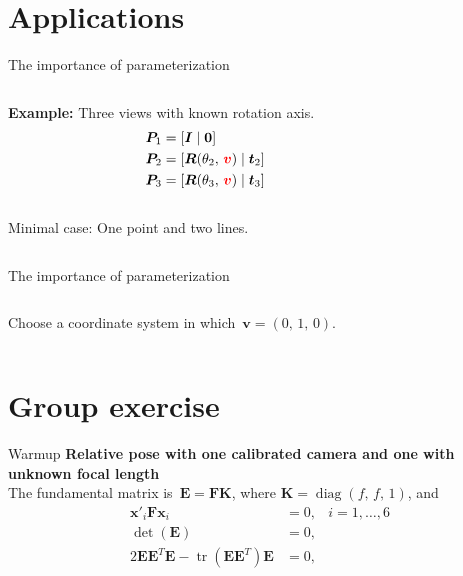 \documentclass[aspectratio=169]{beamer}
\newcommand{\mat}[1]{\bm{#1}}
\DeclareMathOperator{\tr}{tr}
\DeclareMathOperator{\diag}{diag}
\newcommand{\T}{T}
\begin{document}
\section{Applications}
\begin{frame}{The importance of parameterization}
\begin{columns}
    \begin{column}{0.5\textwidth}
        \textbf{Example:} Three views with known rotation axis.\\[8mm]
        \begin{equation*}
            \begin{aligned}
                \mat{P}_1 &= [\mat{I}\;|\;\mat{0}] \\
                \mat{P}_2 &= [\mat{R}(\theta_2,\,{\color{red}\mat{v}})\;|\;\mat{t}_2] \\
                \mat{P}_3 &= [\mat{R}(\theta_3,\,{\color{red}\mat{v}})\;|\;\mat{t}_3]
            \end{aligned}
        \end{equation*}\\[8mm]
        Minimal case: One point and two lines.
    \end{column}%
    \begin{column}{0.5\textwidth}
        \centering
        
    \end{column}
\end{columns}
\end{frame}

\begin{frame}{The importance of parameterization}
\begin{columns}
    \begin{column}{0.5\textwidth}
        Choose a coordinate system in which~$\mat{v}=(0,\,1,\,0)$.
    \end{column}%
    \begin{column}{0.5\textwidth}
        \centering
        
    \end{column}
\end{columns}

\end{frame}

\section{Group exercise}

\begin{frame}{Warmup}
\textbf{Relative pose with one calibrated camera and one with unknown focal length}\\[8mm]
The fundamental matrix is~$\mat{E=FK}$, where $\mat{K}=\diag(f,\,f,\,1)$, and
\begin{equation*}
\begin{aligned}
    \mat{x}'_i\mat{F}\mat{x}_i &= 0, &i=1,\ldots,6\\
    \det(\mat{E}) &= 0, &\\
    2\mat{EE}^\T\mat{E}- \tr(\mat{EE}^\T)\mat{E} &= 0, &
\end{aligned}
\end{equation*}
\end{frame}
\end{document}
